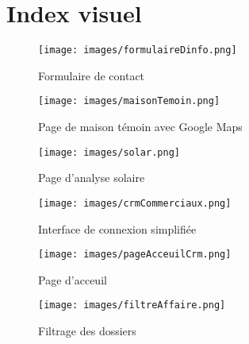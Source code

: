 \section*{Index visuel}

\begin{figure}[H]
    \begin{minipage}[t]{0.6\textwidth}
        \centering
        \texttt{[image: images/formulaireDinfo.png]}
    \end{minipage}
    \begin{minipage}[t]{0.6\textwidth}
        \caption*{Formulaire de contact}
    \end{minipage}
    \vspace{1em}
    \begin{minipage}[t]{0.6\textwidth}
        \centering
        \texttt{[image: images/maisonTemoin.png]}
    \end{minipage}
    \begin{minipage}[t]{0.6\textwidth}
        \caption*{Page de maison témoin avec Google Maps}
    \end{minipage}
    \vspace{1em}
    \begin{minipage}[t]{0.6\textwidth}
        \centering
        \texttt{[image: images/solar.png]}
    \end{minipage}
    \begin{minipage}[t]{0.6\textwidth}
        \caption*{Page d’analyse solaire}
    \end{minipage}
\end{figure}
\newpage

\begin{figure}[H]
    \begin{minipage}[t]{0.6\textwidth}
        \centering
        \texttt{[image: images/crmCommerciaux.png]}
    \end{minipage}
    \begin{minipage}[t]{0.6\textwidth}
        \caption*{Interface de connexion simplifiée}
    \end{minipage}
    \vspace{1em}
    \begin{minipage}[t]{0.6\textwidth}
        \centering
        \texttt{[image: images/pageAcceuilCrm.png]}
    \end{minipage}
    \begin{minipage}[t]{0.6\textwidth}
        \caption*{Page d'acceuil}
    \end{minipage}
    \vspace{1em}
    \begin{minipage}[t]{0.6\textwidth}
        \centering
        \texttt{[image: images/filtreAffaire.png]}
    \end{minipage}
    \begin{minipage}[t]{0.6\textwidth}
        \caption*{Filtrage des dossiers}
    \end{minipage}
\end{figure}
\newpage

